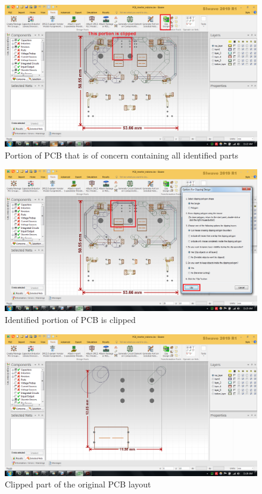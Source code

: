 \begin{enumerate}
\begin{figure} [H]
  \centering
  \includegraphics[width=\linewidth]{pictures/examples/siwave_clip1.png}
  \caption{Portion of PCB that is of concern containing all identified parts}
  \label{fig:PCB_clip1}
\end{figure}

\begin{figure} [H]
  \centering
  \includegraphics[width=\linewidth]{pictures/examples/siwave_clip2.png}
  \caption{Identified portion of PCB is clipped}
  \label{fig:PCB_clip2}
\end{figure}

\begin{figure} [H]
  \centering
  \includegraphics[width=\linewidth]{pictures/examples/siwave_clipped_td.png}
  \caption{Clipped part of the original PCB layout}
  \label{fig:PCB_clipped}
\end{figure}


\end{enumerate}
